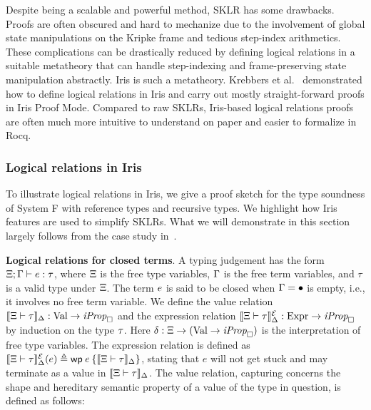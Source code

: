 \documentclass{article}
\theoremstyle{definition}
\theoremstyle{plain}
\theoremstyle{remark}
\begin{document}
Despite being a scalable and powerful method, SKLR has some drawbacks. Proofs are often obscured and hard to mechanize due to the involvement of global state manipulations on the Kripke frame and tedious step-index arithmetics. These complications can be drastically reduced by defining logical relations in a suitable metatheory that can handle step-indexing and frame-preserving state manipulation abstractly.
Iris is such a metatheory. Krebbers et al.~\cite{krebbers2017interactive,krebbers2018mosel} demonstrated how to define logical relations in Iris and carry out mostly straight-forward proofs in Iris Proof Mode.
Compared to raw SKLRs, Iris-based logical relations proofs are often much more intuitive to understand on paper and easier to formalize in Rocq.

\subsubsection{Logical relations in Iris}

To illustrate logical relations in Iris, we give a proof sketch for the type soundness of System F with reference types and recursive types.
We highlight how Iris features are used to simplify SKLRs.
What we will demonstrate in this section largely follows from the case study in~\cite{iris-lecture-notes, jacm-logrel}.

\textbf{Logical relations for closed terms}.
A typing judgement has the form \({\Xi; \Gamma}\vdash{e}\mathrel{:}{\tau}\), where \(\Xi\) is the free type variables, \(\Gamma\) is the free term variables, and \(\tau\) is a valid type under \(\Xi\).
The term \(e\) is said to be closed when \(\Gamma = \bullet\) is empty, i.e., it involves no free term variable.
We define the value relation \(\llbracket \Xi \vdash \tau \rrbracket_{\Delta} : \mathrm{Val} \to \textit{iProp}_{\mathop{\Box}}\) and the expression relation \(\llbracket \Xi \vdash \tau \rrbracket^{\mathcal{E}}_{\Delta} : \mathrm{Expr} \to \textit{iProp}_{\mathop{\Box}}\) by induction on the type \(\tau\).
Here \(\delta : \Xi \to (\mathrm{Val} \to \textit{iProp}_{\mathop{\Box}})\) is the interpretation of free type variables.
The expression relation is defined as \(\semEtype{\Tenv}{\typ}{\semenv}(\expr) \eqdef \wpre{e}{\semVtype{\Tenv}{\typ}{\semenv}}\), stating that \(e\) will not get stuck and may terminate as a value in \(\llbracket \Xi \vdash \tau \rrbracket_{\Delta}\).
The value relation, capturing concerns the shape and hereditary semantic property of a value of the type in question, is defined as follows:
\end{document}
